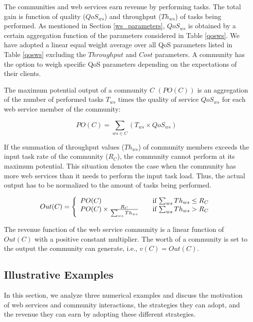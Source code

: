 \documentclass[10pt,journal,cspaper,compsoc]{IEEEtran}
\begin{document}
The communities and web services earn revenue by performing tasks.
The total gain is function of quality ($QoS_{ws}$) and throughput
($Th_{ws}$) of tasks being performed. As mentioned in Section
\ref{ws_parameters}, $QoS_{ws}$ is obtained by a certain
aggregation function of the parameters considered in Table
\ref{qosws}. We have adopted a linear equal weight average over
all QoS parameters listed in Table \ref{qosws} excluding the
$Throughput$ and $Cost$ parameters. A community has the option to
weigh specific QoS parameters depending on the expectations of
their clients.

The maximum potential output of a community $C$ $(PO(C))$  is an
aggregation of the number of performed tasks $T_{ws}$ times the
quality of service $QoS_{ws}$ for each web service member of the
community:

\begin{equation}
PO(C) = \sum_{ws \in C}{(T_{ws} \times QoS_{ws})}
\end{equation}

If the summation of throughput values ($Th_{ws}$) of community
members exceeds the input task rate of the community ($R_C$), the
community cannot perform at its maximum potential. This situation
denotes the case when the community has more web services than it
needs to perform the input task load. Thus, the actual output has
to be normalized to the amount of tasks being performed.

\begin{equation}\label{out_c}
Out(C) = \left\{
  \begin{array}{l l}
    PO(C) & \quad \text{if $\sum_{ws}{Th_{ws}} \leq R_{C}$}\\
    PO(C) \times \frac{R_{C}}{\sum_{ws}{Th_{ws}}} & \quad \text{if $\sum_{ws}{Th_{ws}} > R_{C}$}
  \end{array} \right.
\end{equation}

The revenue function of the web service community is a linear
function of $Out(C)$ with a positive constant multiplier. The
worth of a community is set to the output the community can
generate, i.e., $v(C) = Out(C)$.

\subsection{Illustrative Examples}

In this section, we analyze three numerical examples and discuss
the motivation of web services and community interactions, the
strategies they can adopt, and the revenue they can earn by
adopting these different strategies.
\end{document}
